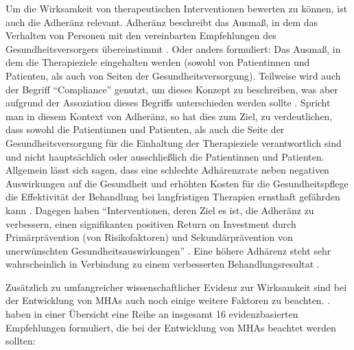 Um die Wirksamkeit von therapeutischen Interventionen bewerten zu können, ist auch die Adheränz relevant. 
Adheränz beschreibt das Ausmaß, in dem das Verhalten von Personen mit den vereinbarten Empfehlungen des Gesundheitsversorgers übereinstimmt \cite[S.3]{sabate_e_adherence_2003}. %
Oder anders formuliert: Das Ausmaß, in dem die Therapieziele eingehalten werden 
(sowohl von Patientinnen und Patienten, als auch von Seiten der Gesundheitsversorgung). 
Teilweise wird auch der Begriff “Compliance” genutzt, um dieses Konzept zu beschreiben, was aber 
aufgrund der Assoziation dieses Begriffs unterschieden werden sollte 
\cite[S.4]{sabate_e_adherence_2003}. %
Spricht man in diesem Kontext von Adheränz, so hat dies zum Ziel, zu verdeutlichen, 
dass sowohl die Patientinnen und Patienten, als auch die Seite der Gesundheitsversorgung für die Einhaltung 
der Therapieziele verantwortlich sind und nicht hauptsächlich oder ausschließlich die Patientinnen 
und Patienten. \\
Allgemein lässt sich sagen, dass eine schlechte Adhärenzrate neben negativen Auswirkungen auf die Gesundheit 
und erhöhten Kosten für die Gesundheitspflege die Effektivität der Behandlung bei langfristigen Therapien 
ernsthaft gefährden kann \cite[XIII]{sabate_e_adherence_2003}. %
Dagegen haben “Interventionen, deren Ziel es ist, die Adheränz zu verbessern, 
einen signifikanten positiven Return on Investment durch Primärprävention (von Risikofaktoren) 
und Sekundärprävention von unerwünschten Gesundheitsauswirkungen” 
\cite[XIII]{sabate_e_adherence_2003}. %
Eine höhere Adhärenz steht sehr wahrscheinlich in Verbindung zu einem verbesserten Behandlungsresultat 
\cite[]{weisel_innovations_2021,fuhr_association_2018}. %

Zusätzlich zu umfangreicher wissenschaftlicher Evidenz zur Wirksamkeit sind bei der Entwicklung von MHAs 
auch noch einige weitere Faktoren zu beachten. 
\cite{bakker_mental_2016}. %
haben in einer Übersicht eine Reihe an insgesamt 16 evidenzbasierten Empfehlungen formuliert, 
die bei der Entwicklung von MHAs beachtet werden sollten:

